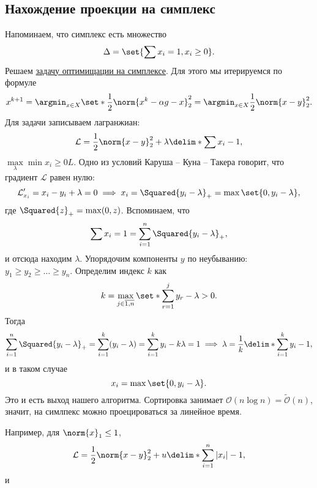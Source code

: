 \subsection{Нахождение проекции на симплекс}
Напоминаем, что симплекс есть множество
\begin{equation*}
    \Delta = \set{\sum x_i = 1, x_i \geq 0}.
\end{equation*}
Решаем \hyperref[simplex-min]{задачу оптимищации на симплексе}. Для этого мы итерируемся по формуле
\begin{equation*}
    x^{k + 1} = \argmin_{x \in X}\set*{\frac12 \norm{x^k - \alpha g - x}_2^2} = \argmin_{x \in X} \frac12 \norm{x - y}_2^2.
\end{equation*}
Для задачи записываем лагранжиан:
\begin{equation*}
    \mathcal{L} = \frac12\norm{x - y}_2^2 + \lambda\delim*{\sum x_i - 1},
\end{equation*}
$\max\limits_\lambda \min\limits{x_i \geq 0} L$. Одно из условий Каруша -- Куна -- Такера говорит, что градиент $\mathcal{L}$ равен нулю:
\begin{equation*}
    \mathcal{L}'_{x_i} = x_i - y_i + \lambda = 0 \implies x_i = \Squared{y_i - \lambda}_{+} = \max\set{0, y_i - \lambda},
\end{equation*}
где $\Squared{z}_{+} = \max(0, z)$. Вспоминаем, что 
\begin{equation*}
    \sum x_i = 1 = \sum_{i = 1}^{n} \Squared{y_i - \lambda}_{+},
\end{equation*}
и отсюда находим $\lambda$. Упорядочим компоненты $y$ по неубыванию: $y_1 \geq y_2 \geq \ldots \geq y_n$. Определим индекс $k$ как
\begin{equation*}
    k = \max_{j \in \overline{1, n}}\set*{\sum_{r = 1}^j y_r - \lambda > 0}.
\end{equation*}
Тогда
\begin{equation*}
    \sum_{i = 1}^n \Squared{y_i - \lambda}_{+} = \sum_{i = 1}^k (y_i - \lambda) = \sum_{i = 1}^k y_i - k\lambda = 1 \implies \lambda = \frac{1}{k}\delim*{\sum_{i = 1}^k y_i - 1},
\end{equation*}
и в таком случае
\begin{equation*}
    x_i = \max\set{0, y_i - \lambda}.
\end{equation*}
Это и есть выход нашего алгоритма. Сортировка занимает $\mathcal{O}(n\log n) = \tilde{\mathcal{O}}(n)$, значит, на симлпекс можно проецироваться за линейное время. 

Например, для $\norm{x}_1 \leq 1$, 
\begin{equation*}
    \mathcal{L} = \frac12\norm{x - y}_2^2 + u\delim*{\sum_{i = 1}^n |x_i| - 1},
\end{equation*}
и

